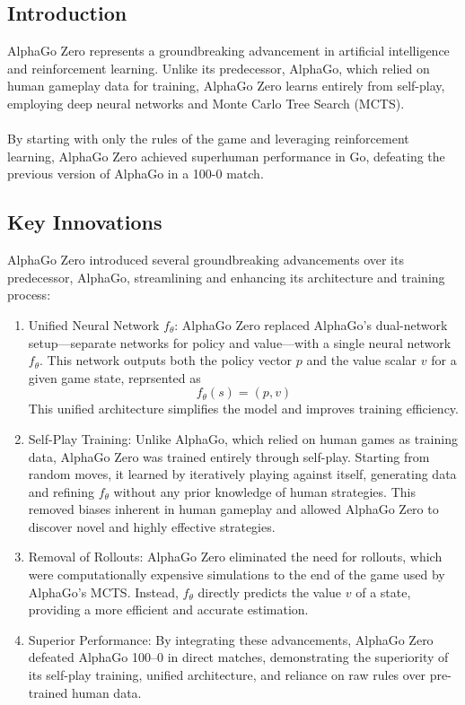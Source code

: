 \subsection{Introduction}
AlphaGo Zero represents a groundbreaking advancement in artificial intelligence and reinforcement learning. Unlike its predecessor, AlphaGo, which relied on human gameplay data for training, AlphaGo Zero learns entirely from self-play, employing deep neural networks and Monte Carlo Tree Search (MCTS). \cite{agz1}
\\\\
By starting with only the rules of the game and leveraging reinforcement learning, AlphaGo Zero achieved superhuman performance in Go, defeating the previous version of AlphaGo in a 100-0 match. 
\subsection{Key Innovations}

AlphaGo Zero introduced several groundbreaking advancements over its predecessor, AlphaGo, streamlining and enhancing its architecture and training process:

\begin{enumerate}
    \item Unified Neural Network \( f_\theta \):
    AlphaGo Zero replaced AlphaGo's dual-network setup—separate networks for policy and value—with a single neural network \( f_\theta \). This network outputs both the policy vector \( p \) and the value scalar \( v \) for a given game state, reprsented as \[ f_\theta(s) = (p, v) \] This unified architecture simplifies the model and improves training efficiency.

    \item Self-Play Training:
    Unlike AlphaGo, which relied on human games as training data, AlphaGo Zero was trained entirely through self-play. Starting from random moves, it learned by iteratively playing against itself, generating data and refining \( f_\theta \) without any prior knowledge of human strategies. This removed biases inherent in human gameplay and allowed AlphaGo Zero to discover novel and highly effective strategies.

    \item Removal of Rollouts:
    AlphaGo Zero eliminated the need for rollouts, which were computationally expensive simulations to the end of the game used by AlphaGo's MCTS. Instead, \( f_\theta \) directly predicts the value \( v \) of a state, providing a more efficient and accurate estimation.


    \item Superior Performance:
    By integrating these advancements, AlphaGo Zero defeated AlphaGo 100–0 in direct matches, demonstrating the superiority of its self-play training, unified architecture, and reliance on raw rules over pre-trained human data.
\end{enumerate}

